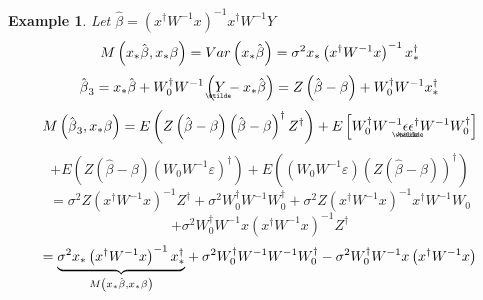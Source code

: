 \documentclass{article}
\newtheorem{example}[theorem]{Example}
\begin{document}
\begin{example}
Let $\hat{\beta}=\left( x^{\dagger }W^{-1}x\right) ^{-1}x^{\dagger }W^{-1}Y$%
\begin{equation*}
M\left( x_{\ast }\hat{\beta},x_{\ast }\beta \right) =Var\left( x_{\ast }\hat{%
\beta}\right) =\sigma ^{2}x_{\ast }\left( x^{\dagger }W^{-1}x\right)
^{-1}x_{\ast }^{\dagger }
\end{equation*}%
\begin{equation*}
\hat{\beta}_{3}=x_{\ast }\hat{\beta}+W_{0}^{\dagger }W^{-1}\left( 
\underaccent{\wtilde}{Y}%
-x_{\ast }\hat{\beta}\right) =Z\left( \hat{\beta}-\beta \right)
+W_{0}^{\dagger }W^{-1}x_{\ast }^{\dagger }
\end{equation*}%
\begin{equation*}
M\left( \hat{\beta}_{3},x_{\ast }\beta \right) =E\left( Z\left( \hat{\beta}%
-\beta \right) \left( \hat{\beta}-\beta \right) ^{\dagger }Z^{\dagger
}\right) +E\left[ W_{0}^{\dagger }W^{-1}%
\underaccent{\wtilde}{\epsilon}%
\underaccent{\wtilde}{\epsilon}%
^{\dagger }W^{-1}W_{0}^{\dagger }\right]
\end{equation*}%
\begin{equation*}
+E\left( Z\left( \hat{\beta}-\beta \right) \left( W_{0}W^{-1}\varepsilon
\right) ^{\dagger }\right) +E\left( \left( W_{0}W^{-1}\varepsilon \right)
\left( Z\left( \hat{\beta}-\beta \right) \right) ^{\dagger }\right)
\end{equation*}%
\begin{equation*}
=\sigma ^{2}Z\left( x^{\dagger }W^{-1}x\right) ^{-1}Z^{\dagger }+\sigma
^{2}W_{0}^{\dagger }W^{-1}W_{0}^{\dagger }+\sigma ^{2}Z\left( x^{\dagger
}W^{-1}x\right) ^{-1}x^{\dagger }W^{-1}W_{0}
\end{equation*}%
\begin{equation*}
+\sigma ^{2}W_{0}^{\dagger }W^{-1}x\left( x^{\dagger }W^{-1}x\right)
^{-1}Z^{\dagger }
\end{equation*}%
\begin{equation*}
=\underset{M\left( x_{\ast }\hat{\beta},x_{\ast }\beta \right) }{\underbrace{%
\sigma ^{2}x_{\ast }\left( x^{\dagger }W^{-1}x\right) ^{-1}x_{\ast
}^{\dagger }}}+\sigma ^{2}W_{0}^{\dagger }W^{-1}W^{-1}W_{0}^{\dagger
}-\sigma ^{2}W_{0}^{\dagger }W^{-1}x\left( x^{\dagger }W^{-1}x\right)

\end{equation*}
\end{example}
\end{document}
